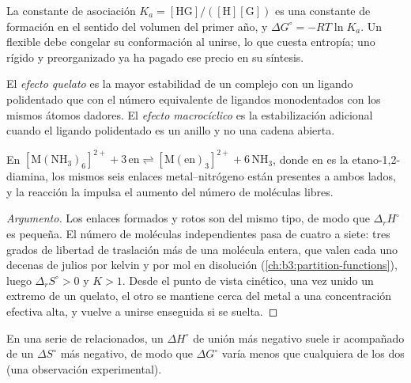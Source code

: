 La constante de asociación $K_a = [\mathrm{HG}]/([\mathrm H][\mathrm G])$ es una constante de formación en el sentido
del volumen del primer año, y $\Delta G^\circ = -RT\ln K_a$. Un  flexible debe congelar su
conformación al unirse, lo que cuesta entropía; uno rígido y preorganizado ya ha
pagado ese precio en su síntesis.

\begin{definition}\label{def:b3:supramolecular:macrocyclic}
El \emph{efecto quelato} es la mayor estabilidad de un
complejo con un ligando polidentado que con el número equivalente de
ligandos monodentados con los mismos átomos dadores. El \emph{efecto
macrocíclico} es la estabilización adicional cuando el
ligando polidentado es un anillo y no una cadena abierta.
\end{definition}

\begin{proposition}\label{prop:b3:supramolecular:chelate-entropy}
En $\mathrm{[M(NH_3)_6]^{2+} + 3\,en \rightleftharpoons [M(en)_3]^{2+} + 6\,NH_3}$, donde en es la etano-1,2-diamina, los mismos seis
enlaces metal--nitrógeno están presentes a ambos lados, y la reacción la impulsa
el aumento del número de moléculas libres.
\end{proposition}

\begin{proof}[Argumento]
Los enlaces formados y rotos son del mismo tipo, de modo que $\Delta_rH^\circ$ es pequeña. El número de
moléculas independientes pasa de cuatro a siete: tres grados de libertad de traslación
más de una molécula entera, que valen cada uno decenas de julios por kelvin
y por mol en disolución (\cref{ch:b3:partition-functions}), luego $\Delta_rS^\circ > 0$ y $K > 1$.
Desde el punto de vista cinético, una vez unido un extremo de un quelato, el otro se mantiene cerca del
metal a una concentración efectiva alta, y vuelve a unirse enseguida si se suelta.
\end{proof}

\begin{proposition}\label{prop:b3:supramolecular:compensation}
En una serie de  relacionados, un $\Delta H^\circ$ de unión más negativo
suele ir acompañado de un $\Delta S^\circ$ más negativo, de modo que $\Delta G^\circ$ varía menos que cualquiera de los dos (una
observación experimental).
\end{proposition}


